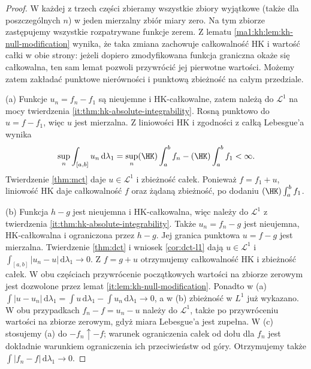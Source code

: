 \begin{proof}
W każdej z trzech części zbieramy wszystkie zbiory
wyjątkowe (także dla poszczególnych $n$) w jeden
mierzalny zbiór miary zero. Na tym zbiorze zastępujemy
wszystkie rozpatrywane funkcje zerem. Z lematu
\ref{ma1:kh:lem:kh-null-modification} wynika, że taka
zmiana zachowuje całkowalność HK i wartość całki
w obie strony: jeżeli dopiero zmodyfikowana funkcja
graniczna okaże się całkowalna, ten sam lemat
pozwoli przywrócić jej pierwotne wartości.
Możemy zatem zakładać punktowe nierówności
i punktową zbieżność na całym przedziale.

(a) Funkcje $u_n=f_n-f_1$ są nieujemne i HK-całkowalne, zatem należą do $\mathcal L^1$ na mocy twierdzenia \ref{it:thm:hk-absolute-integrability}. Rosną punktowo do $u=f-f_1$, więc $u$ jest mierzalna. Z liniowości HK i zgodności z całką Lebesgue'a wynika
\[
 \sup_n\int_{[a,b]}u_n\,\mathrm d\lambda_1
 =\sup_n(\HK)\int_a^b f_n-(\HK)\int_a^b f_1<\infty.
\]
Twierdzenie \ref{thm:mct} daje $u\in\mathcal L^1$ i zbieżność całek. Ponieważ $f=f_1+u$, liniowość HK daje całkowalność $f$ oraz żądaną zbieżność, po dodaniu $(\HK)\int_a^b f_1$.

(b) Funkcja $h-g$ jest nieujemna i HK-całkowalna, więc należy do $\mathcal L^1$ z twierdzenia \ref{it:thm:hk-absolute-integrability}. Także $u_n=f_n-g$ jest nieujemna, HK-całkowalna i ograniczona przez $h-g$. Jej granica punktowa $u=f-g$ jest mierzalna. Twierdzenie \ref{thm:dct} i wniosek \ref{cor:dct-l1} dają $u\in\mathcal L^1$ i $\int_{[a,b]}|u_n-u|\,\mathrm d\lambda_1\to0$. Z $f=g+u$ otrzymujemy całkowalność HK i zbieżność całek. W obu częściach przywrócenie początkowych wartości na zbiorze zerowym jest dozwolone przez lemat \ref{it:lem:kh-null-modification}. Ponadto w (a) $\int|u-u_n|\,\mathrm d\lambda_1=\int u\,\mathrm d\lambda_1-\int u_n\,\mathrm d\lambda_1\to0$, a w (b) zbieżność w $L^1$ już wykazano. W obu przypadkach $f_n-f=u_n-u$ należy do $\mathcal L^1$,
także po przywróceniu wartości na zbiorze zerowym,
gdyż miara Lebesgue'a jest zupełna.
W (c) stosujemy (a) do $-f_n\uparrow-f$; warunek
ograniczenia całek od dołu dla $f_n$ jest dokładnie
warunkiem ograniczenia ich przeciwieństw od góry.
Otrzymujemy także $\int|f_n-f|\,\mathrm d\lambda_1\to0$.


\end{proof}
